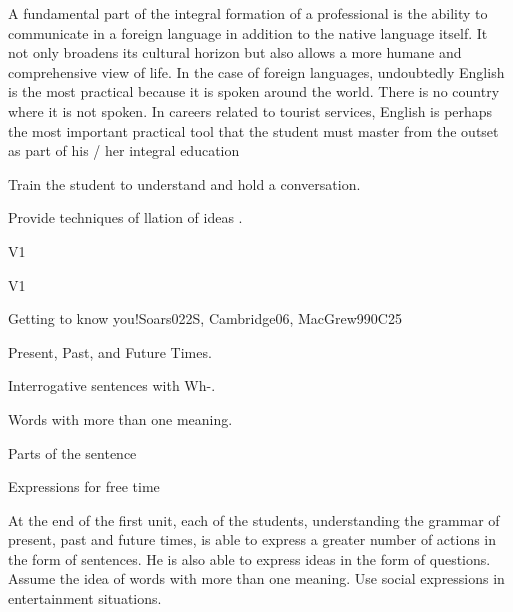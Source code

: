 \begin{syllabus}


\begin{justification}
A fundamental part of the integral formation of a professional is the ability to communicate in a foreign language in addition to the native language itself.
It not only broadens its cultural horizon but also allows a more humane and comprehensive view of life. In the case of foreign languages, undoubtedly English is the most practical because it is spoken around the world. There is no country where it is not spoken. In careers related to tourist services, English is perhaps the most important practical tool that the student must master from the outset as part of his / her integral education

\end{justification}

\begin{goals}
\item Train the student to understand and hold a conversation.
\item Provide techniques of llation of ideas .
\end{goals}

\begin{outcomes}{V1}
\item {}
\end{outcomes}

\begin{competences}{V1}
\item {}
\end{competences}

\begin{unit}{Getting to know you!}{}{Soars022S, Cambridge06, MacGrew99}{0}{C25}
   \begin{topics}
      \item Present, Past, and Future Times.
      \item Interrogative sentences with Wh-.
      \item Words with more than one meaning.
      \item Parts of the sentence
      \item Expressions for free time
   \end{topics}

   \begin{learningoutcomes}
      \item At the end of the first unit, each of the students, understanding the grammar of present, past and future times, is able to express a greater number of actions in the form of sentences. He is also able to express ideas in the form of questions.
            Assume the idea of words with more than one meaning. Use social expressions in entertainment situations. 
   \end{learningoutcomes}
\end{unit}


\end{syllabus}
